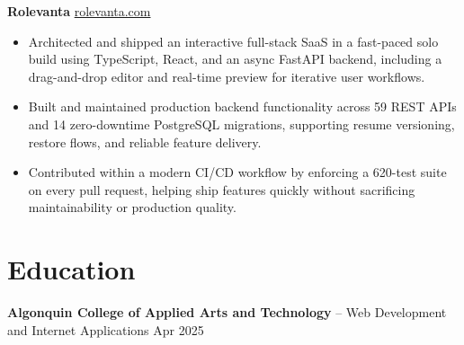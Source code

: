 \documentclass[11pt]{article}       %
\begin{document}
\textbf{Rolevanta} \hfill \href{https://rolevanta.com}{rolevanta.com} \\
\vspace{-9pt}
\begin{itemize}
  \item Architected and shipped an interactive full-stack SaaS in a fast-paced solo build using TypeScript, React, and an async FastAPI backend, including a drag-and-drop editor and real-time preview for iterative user workflows.
  \item Built and maintained production backend functionality across 59 REST APIs and 14 zero-downtime PostgreSQL migrations, supporting resume versioning, restore flows, and reliable feature delivery.
  \item Contributed within a modern CI/CD workflow by enforcing a 620-test suite on every pull request, helping ship features quickly without sacrificing maintainability or production quality.
\end{itemize}






\section*{Education}
\textbf{Algonquin College of Applied Arts and Technology} -- Web Development and Internet Applications
\hfill Apr 2025 \\
\end{document}
